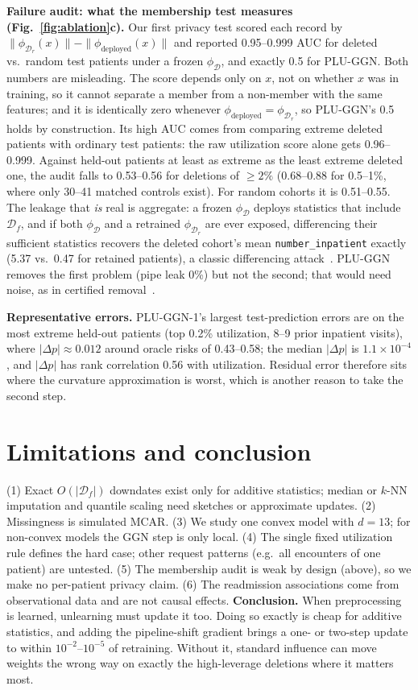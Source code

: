 \documentclass{article}
\newcommand{\Df}{\mathcal{D}_f}
\newcommand{\Dr}{\mathcal{D}_r}
\newcommand{\D}{\mathcal{D}}
\begin{document}
\textbf{Failure audit: what the membership test measures (Fig.~\ref{fig:ablation}c).} Our first
privacy test scored each record by $\|\phi_{\Dr}(x)\|-\|\phi_{\mathrm{deployed}}(x)\|$ and reported
0.95--0.999 AUC for deleted vs.\ random test patients under a frozen $\phi_\D$, and exactly 0.5 for
PLU-GGN. Both numbers are misleading. The score depends only on $x$, not on whether $x$ was in
training, so it cannot separate a member from a non-member with the same features; and it is
identically zero whenever $\phi_{\mathrm{deployed}}=\phi_{\Dr}$, so PLU-GGN's 0.5 holds by
construction. Its high AUC comes from comparing extreme deleted patients with ordinary test patients:
the raw utilization score alone gets 0.96--0.999. Against held-out patients at least as extreme as the
least extreme deleted one, the audit falls to 0.53--0.56 for deletions of $\ge2\%$ (0.68--0.88 for
0.5--1\%, where only 30--41 matched controls exist). For random cohorts it is 0.51--0.55. The leakage
that \emph{is} real is aggregate: a frozen $\phi_\D$ deploys statistics that include $\Df$, and if both
$\phi_\D$ and a retrained $\phi_{\Dr}$ are ever exposed, differencing their sufficient statistics recovers
the deleted cohort's mean \texttt{number\_inpatient} exactly (5.37 vs.\ 0.47 for retained patients),
a classic differencing attack~\cite{dinur2003}. PLU-GGN removes the first problem (pipe leak 0\%) but
not the second; that would need noise, as in certified removal~\cite{guo2020}.

\textbf{Representative errors.} PLU-GGN-1's largest test-prediction errors are on the most extreme
held-out patients (top 0.2\% utilization, 8--9 prior inpatient visits), where $|\Delta p|\approx0.012$
around oracle risks of 0.43--0.58; the median $|\Delta p|$ is $1.1\times10^{-4}$, and $|\Delta p|$ has
rank correlation 0.56 with utilization. Residual error therefore sits where the curvature
approximation is worst, which is another reason to take the second step.

\section{Limitations and conclusion}
\label{sec:limits}
(1) Exact $O(|\Df|)$ downdates exist only for additive statistics; median or $k$-NN imputation and
quantile scaling need sketches or approximate updates. (2) Missingness is simulated MCAR. (3) We study
one convex model with $d=13$; for non-convex models the GGN step is only local. (4) The single fixed
utilization rule defines the hard case; other request patterns (e.g.\ all encounters of one patient)
are untested. (5) The membership audit is weak by design (above), so we make no per-patient privacy
claim. (6) The readmission associations come from observational data and are not causal effects.
\textbf{Conclusion.} When preprocessing is learned, unlearning must update it too. Doing so exactly is
cheap for additive statistics, and adding the pipeline-shift gradient brings a one- or two-step update
to within $10^{-2}$--$10^{-5}$ of retraining. Without it, standard influence can move weights the
wrong way on exactly the high-leverage deletions where it matters most.
\end{document}
